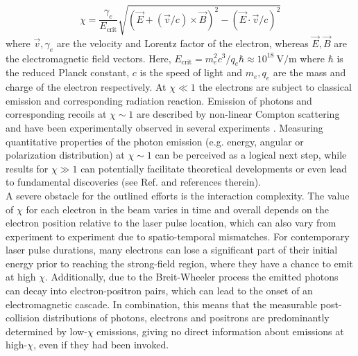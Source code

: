 \documentclass[%
 reprint,
 amsmath,amssymb,
 aps,
]{revtex4-2}
\begin{document}
\begin{equation} \label{eq:chi}
\chi = \frac{\gamma_e}{E_\text{crit}} \sqrt{\left(\vec{E} + \left(\vec{v}/c\right) \times \vec{B}\right)^2 - \left(\vec{E} \cdot \vec{v} /c\right)^2}
\end{equation} 
where $\vec{v}, \gamma_e$ are the velocity and Lorentz factor of the electron, whereas $\vec{E},\vec{B}$ are the electromagnetic field vectors. Here, $E_\text{crit}=m_e^2 c^3/q_e\hbar\approx 10^{18} ~ \si{\volt\per\meter}$ where $\hbar$ is the reduced Planck constant, $c$ is the speed of light and $m_e, q_e$ are the mass and charge of the electron respectively. At $\chi \ll 1$ the electrons are subject to classical emission and corresponding radiation reaction. Emission of photons and corresponding recoils at $\chi \sim 1$ are described by non-linear Compton scattering and have been experimentally observed in several experiments \cite{bula1996observation,iinuma2005observation,kumita2006observation,englert1983second}. Measuring quantitative properties of the photon emission (e.g. energy, angular or polarization distribution) at $\chi \sim 1$ can be perceived as a logical next step, while results for $\chi \gg 1$ can potentially facilitate theoretical developments or even lead to fundamental discoveries (see Ref. \cite{fedotov2022advances} and references therein). \\

A severe obstacle for the outlined efforts is the interaction complexity. The value of $\chi$ for each electron in the beam varies in time and overall depends on the electron position relative to the laser pulse location, which can also vary from experiment to experiment due to spatio-temporal mismatches. For contemporary laser pulse durations, many electrons can lose a significant part of their initial energy prior to reaching the strong-field region, where they have a chance to emit at high $\chi$. Additionally, due to the Breit-Wheeler process the emitted photons can decay into electron-positron pairs, which can lead to the onset of an electromagnetic cascade. In combination, this means that the measurable post-collision distributions of photons, electrons and positrons are predominantly determined by low-$\chi$ emissions, giving no direct information about emissions at high-$\chi$, even if they had been invoked. \\
\end{document}
